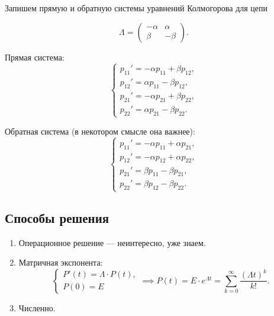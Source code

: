 \begin{ex}
  Запишем прямую и обратную системы уравнений Колмогорова для цепи
  \begin{figure}[h!]
    \centering
  \end{figure}
  \[
    \Lambda = \begin{pmatrix}
      -\alpha & \alpha \\
      \beta & - \beta
    \end{pmatrix}.
  \]

  Прямая система:
  \[
    \begin{cases}
      p_{11}' = - \alpha p_{11} + \beta p_{12}, \\
      p_{12}' = \alpha p_{11} - \beta p_{12}, \\
      p_{21}' = -\alpha p_{21} + \beta p_{22}, \\
      p_{22}' = \alpha p_{21} - \beta p_{22}.
    \end{cases}
  \]

  Обратная система (в некотором смысле она важнее):
  \[
    \begin{cases}
      p_{11}' = - \alpha p_{11} + \alpha p_{21}, \\
      p_{12}' = -\alpha p_{12} + \alpha p_{22}, \\
      p_{21}' = \beta p_{11} - \beta p_{21}, \\
      p_{22}' = \beta p_{12} - \beta p_{22}.
    \end{cases}
  \]
\end{ex}

\subsection{Способы решения}
\begin{enumerate}
  \item Операционное решение --- неинтересно, уже знаем.
  \item Матричная экспонента:
    \[
      \begin{cases}
        P'(t) = \Lambda \cdot P(t), \\
        P(0) = E
      \end{cases}
      \implies
      P(t) = E \cdot e^{\Lambda t} = \sum_{k=0}^\infty \dfrac{(\Lambda
      t)^k}{k!}.
    \]
  \item Численно.
\end{enumerate}


